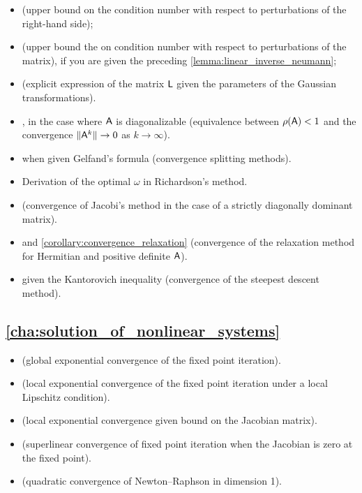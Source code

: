 \begin{itemize}
    \item {} (upper bound on the condition number with respect to perturbations of the right-hand side);
    \item {} (upper bound the on condition number with respect to perturbations of the matrix),
        if you are given the preceding \cref{lemma:linear_inverse_neumann};
    \item {} (explicit expression of the matrix $\mathsf L$ given the parameters of the Gaussian transformations).
    \item {},
        in the case where $\mathsf A$ is diagonalizable (equivalence between $\rho(\mathsf A) < 1$ and the convergence $\lVert\mathsf A^k\rVert \to 0$ as $k \to \infty$).

    \item {} when given Gelfand's formula (convergence splitting methods).
    \item Derivation of the optimal $\omega$ in Richardson's method.
    \item {} (convergence of Jacobi's method in the case of a strictly diagonally dominant matrix).
    \item {} and \cref{corollary:convergence_relaxation} (convergence of the relaxation method for Hermitian and positive definite $\mathsf A$).
    \item {} given the Kantorovich inequality (convergence of the steepest descent method).
\end{itemize}

\subsection*{\cref{cha:solution_of_nonlinear_systems}}%

\begin{itemize}
    \item {} (global exponential convergence of the fixed point iteration).
    \item {} (local exponential convergence of the fixed point iteration under a local Lipschitz condition).
    \item {}  (local exponential convergence given bound on the Jacobian matrix).
    \item {} (superlinear convergence of fixed point iteration when the Jacobian is zero at the fixed point).
    \item {} (quadratic convergence of Newton--Raphson in dimension 1).
\end{itemize}


